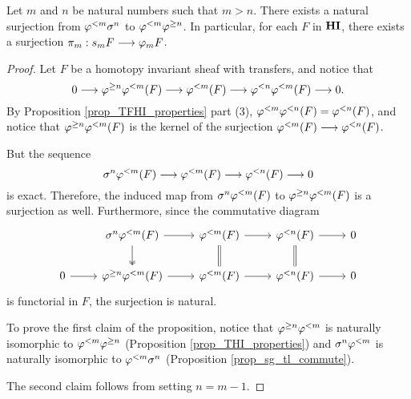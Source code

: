 \begin{prop}\label{prop_struct_consts}
Let $m$ and $n$ be natural numbers such that $m > n$. There exists 
a natural surjection from $\varphi^{< m} \sigma^{n}$ to $\varphi^{< m} 
\varphi^{\geq n}$. In particular, for each $F$ in $\mathbf{HI}$, there exists a 
surjection $\pi_m: s_m F \longrightarrow \varphi_{m} F$.
\end{prop}
\begin{proof}
Let $F$ be a homotopy invariant sheaf with transfers, and notice that
\[
0 \longrightarrow \varphi^{\geq n} \varphi^{< m}(F) \longrightarrow \varphi^{< m}(F) \longrightarrow 
  \varphi^{< n} \varphi^{< m}(F) \longrightarrow 0.
\]
By Proposition \ref{prop_TFHI_properties} part (3), $\varphi^{< m} \varphi^{< n}(F) 
= \varphi^{< n}(F)$, and notice that $\varphi^{\geq n} \varphi^{< m}(F)$ is the kernel 
of the surjection $\varphi^{< m}(F) \longrightarrow \varphi^{< n}(F)$.

But the sequence
\[
\sigma^{n} \varphi^{< m}(F) \longrightarrow \varphi^{< m}(F) \longrightarrow \varphi^{< n}(F) \longrightarrow 0
\]
is exact. Therefore, the induced map from $\sigma^{n} \varphi^{< m}(F)$
to $\varphi^{\geq n} \varphi^{< m}(F)$ is a surjection as well. Furthermore,
since the commutative diagram
\[
\begin{tikzcd}
{} & \sgHI{n} \tlHI{m}(F) \arrow{r} \arrow[twoheadrightarrow]{d} &
\tlHI{m}(F) \arrow{r} \arrow[equal]{d} &
\tlHI{n}(F) \arrow{r} \arrow[equal]{d} &
0 \\
0 \arrow{r} &
\tgHI{n} \tlHI{m}(F) \arrow{r} &
\tlHI{m}(F) \arrow{r} &
\tlHI{n}(F) \arrow{r} &
0
\end{tikzcd}
\] 
is functorial in $F$, the surjection is natural.

To prove the first claim of the proposition, notice that 
$\varphi^{\geq n} \varphi^{< m}$ is naturally isomorphic to $\varphi^{< m} \varphi^{\geq n}$ 
(Proposition \ref{prop_THI_properties}) and $\sigma^{n} \varphi^{< m}$ is 
naturally isomorphic to $\varphi^{< m} \sigma^{n}$ (Proposition 
\ref{prop_sg_tl_commute}).

The second claim follows from setting $n = m - 1$.
\end{proof}
